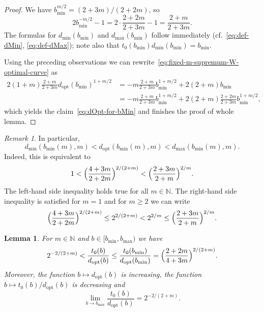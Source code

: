 \documentclass[a4paper]{amsart} %
\newtheorem{lemma}[theorem]{Lemma}
\theoremstyle{definition}
\theoremstyle{remark}
\newtheorem{remark}[theorem]{Remark}
\numberwithin{equation}{section}
\newcommand*{\NN}{\mathbb{N}}
\newcommand*{\bMin}{b_{\min}}
\newcommand*{\bMax}{b_{\max}}
\newcommand*{\dMin}{d_{\min}}
\newcommand*{\dMax}{d_{\max}}
\newcommand*{\dOpt}{d_{\mathrm{opt}}}
\begin{document}
\begin{proof}	
	We have $\bMin^{m/2} = (2+3m)/(2+2m)$, so
	\[
	2\bMin^{-m/2}  - 1 = 2 \cdot \frac{2+2m}{2+3m} - 1 = 
	\frac{2+m}{2+3m}.
	\]
	The formulas for $\dMin(\bMin)$ and $\dMax(\bMin)$ follow immediately (cf.\ \eqref{eq:def-dMin}, \eqref{eq:def-dMax}); note also that
	$t_0(\bMin) \dMin(\bMin)= \bMin$.
	
	
	Using the preceding observations 
	we can rewrite~\eqref{eq:fixed-m-supremum-W-optimal-curve}
	as
	\begin{align*}  
	2(1+m)\frac{2+m}{2+3m} \dOpt(\bMin)^{1+m/2} 
	&= -m \frac{2+m}{2+3m} \bMin^{1+m/2}   
	+ 2(2+m) \bMin\\
	&= -m \frac{2+m}{2+3m} \bMin^{1+m/2}   
	+ 2(2+m) \frac{2+2m}{2+3m} \bMin^{1+m/2}, 
	\end{align*}
	which yields the claim~\eqref{eq:dOpt-for-bMin} and finishes the proof of whole lemma.
\end{proof}

\begin{remark}
	In particular,
	\begin{equation}
	\label{eq:claim-dOpt-for-bMin}
	\dMin(\bMin(m),m)  < \dOpt(\bMin(m),m)  < \dMax(\bMin(m),m).
	\end{equation}
	Indeed, this is equivalent to
	\[
	1 < \Bigl( \frac{4+3m}{2+2m}\Bigr)^{2/(2+m)} < \Bigl( \frac{2+3m}{2+m}\Bigr)^{2/m}.
	\]
	The left-hand side inequality holds true for all $m\in \NN$.
	The right-hand side inequality is satisfied for $m=1$ and for $m\geq 2$ we can write
	\[
	\Bigl( \frac{4+3m}{2+2m}\Bigr)^{2/(2+m)}
	\leq 2^{2/(2+m)} < 2^{2/m}  \leq  \Bigl( \frac{2+3m}{2+m}\Bigr)^{2/m}.
	\]
\end{remark}




\begin{lemma}
	\label{lem:tZero-divied-by-dOpt-monotone}
	For $m\in\NN$ and 
	$b\in [\bMin, \bMax)$ we have
	\[
	2^{-2/(2+m)}  < \frac{t_0(b)}{\dOpt(b)} \leq \frac{t_0(\bMin)}{\dOpt(\bMin)} 
	=
	\Bigl(\frac{2+2m}{4+3m}\Bigr)^{2/(2+m)}.
	\]
	Moreover, the function $b\mapsto \dOpt(b)$ is increasing, the function $b\mapsto t_0(b)/\dOpt(b)$ is decreasing and  
	\[
	\lim_{b\to\bMax}\frac{t_0(b)}{\dOpt(b)}
	= 2^{-2/(2+m)}.
	\]
\end{lemma}
\end{document}

